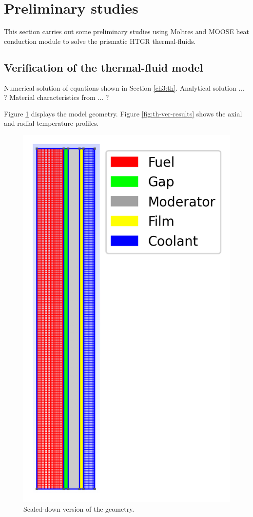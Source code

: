 \section{Preliminary studies}

This section carries out some preliminary studies using Moltres and MOOSE heat conduction module to solve the prismatic HTGR thermal-fluids.

\subsection{Verification of the thermal-fluid model}

Numerical solution of equations shown in Section \ref{ch3:th}.
Analytical solution ... ?
Material characteristics from ... ?

Figure \ref{fig:th-ver-mesh} displays the model geometry.
Figure \ref{fig:th-ver-results} shows the axial and radial temperature profiles.

\begin{figure}[htbp!]
	\centering
	\includegraphics[width=0.45\linewidth]{figures-thermal/2D-preliminar-mesh2}
	\hfill
	\caption{Scaled-down version of the geometry.}
	\label{fig:th-ver-mesh}
\end{figure}

